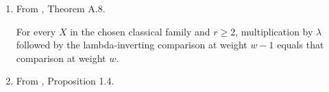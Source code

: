 \begin{theorem}
\begin{enumerate}
For two synthetic cofiber triangles $T,U$, there is an object $V$ with maps to $T.X\otimes U.Z$, $T.Y\otimes U.Y$, and $T.Z\otimes U.X$, commuting with the two tensor-product squares. Its two boundary composites are negatives of one another. Each pair of homotopy classes in the first two targets agreeing in $T.Y\otimes U.Z$ lifts to a common class on $V$.
\item From \cite{BHS}, Theorem A.8.\par

For every $X$ in the chosen classical family and $r\ge2$, multiplication by $\lambda$ followed by the lambda-inverting comparison at weight $w-1$ equals that comparison at weight $w$.
\item From \cite{BR21}, Proposition 1.4.\par


\end{enumerate}
\end{theorem}
